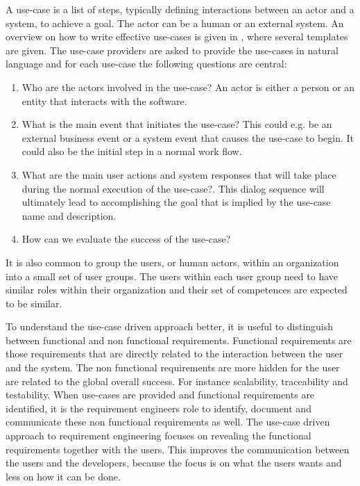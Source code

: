 A use-case is a list of steps, typically defining interactions between an actor and a system, to achieve a goal. The actor can be a human or an external system.  An overview on how to write effective use-cases is given in \cite{Coc01}, where several templates are given. The use-case providers are asked to provide the use-cases in natural language and for each use-case the following questions are central:

\begin{enumerate}
\item Who are the actors involved in the use-case? An actor is either a person or an entity that interacts with the software.  
\item What is the main event that initiates the use-case? This could e.g. be an external business event or a system event that causes the use-case to begin.  It could also be the initial step in a normal work flow. 
\item What are the main user actions and system responses that will take place during the normal execution of the use-case?. This dialog sequence will ultimately lead to accomplishing the goal that is implied by the use-case name and description.
\item How can we evaluate the success of the use-case?
\end{enumerate}
 
It is also common to group the users, or human actors, within an organization into a small set of user groups. The users
within each user group need to have similar roles within their organization and their set of competences are expected to
be similar. \cite{Could we expand a bit on this?} 

To understand the use-case driven approach better, it is useful to distinguish between functional and non functional
requirements.  Functional requirements are those requirements that are directly related to the interaction between the
user and the system.  The non functional requirements are more hidden for the user are related to the global overall
success.  For instance scalability, traceability and testability.  When use-cases are provided and functional
requirements are identified, it is the requirement engineers role to identify, document and communicate these non
functional requirements as well.  The use-case driven approach to requirement engineering focuses on revealing the
functional requirements together with the users.  This improves the communication between the users and the developers,
because the focus is on what the users wants and less on how it can be done. 
